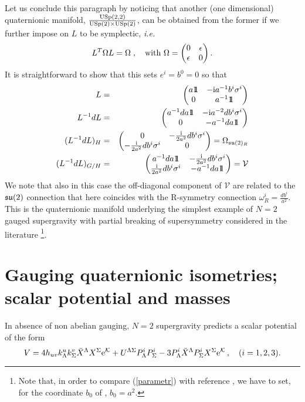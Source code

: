 \documentclass[a4paper,12pt]{article}
\begin{document}
Let us conclude this paragraph by noticing that another (one dimensional) quaternionic manifold, 
$\frac{\mathrm{USp}(2,2)}{\mathrm{USp}(2) \times \mathrm{USp}(2)}$, can be obtained from the former if we further impose on $L$ to be symplectic, {\em i.e.}
$$L^T \Omega L =\Omega \; ,\quad \mbox{with } \Omega = \begin{pmatrix}0&\epsilon \cr \epsilon &0 \cr \end{pmatrix}.$$ 
It is straightforward to show that this sets $e^i = b^0=0$ so that
 \begin{eqnarray}
L& =& \begin{pmatrix}a\id & -\ii a^{-1}b^i\sigma^i \cr 0 & a^{-1}\id 
\cr\end{pmatrix}
\nonumber\\
L^{-1} dL &=& \begin{pmatrix}a^{-1} da\id & -\ii a^{-2}db^i \sigma^i \cr 0 &-a^{-1} da\id \cr \end{pmatrix} \nonumber\\
(L^{-1} dL)_H &=& \begin{pmatrix}0 & -\frac\ii {2a^{2}}db^i \sigma^i \cr -\frac\ii {2a^{2}}db^i \sigma^i  &0\cr\end{pmatrix} =
\Omega_{\fsu(2)_R}\nonumber\\
(L^{-1} dL)_{G/H} &=& \begin{pmatrix}a^{-1} da \id  & -\frac\ii {2a^{2}}db^i \sigma^i \cr \frac\ii {2a^{2}}db^i \sigma^i  & -a^{-1} da \id
\cr\end{pmatrix} =
{\mathcal V} \label{parametr}
\end{eqnarray}
We note that also in this case the off-diagonal component of ${\mathcal V}$ 
are related to the $\mathfrak{su}(2)$ connection that here coincides with the R-symmetry connection $\omega^i_{R}= \frac{db^i}{a^2}$.
This is the quaternionic manifold underlying the simplest example of $N=2$ gauged supergravity with partial breaking of supersymmetry
considered in the literature \cite{cgp3,fgp}
\footnote{
Note that, in order to compare (\ref{parametr}) with reference \cite{fgp},  we have to set, for the coordinate $b_0$ of \cite{fgp}, 
$b_0=a^2$.}.

\section{Gauging quaternionic isometries; scalar potential and masses}

In absence of non abelian gauging, $N=2$ supergravity predicts a scalar potential of the form \cite{abcdffm}
\begin{equation}
V = 4 h_{uv} k^u_\Lambda k^v_\Sigma\bar X^\Lambda X^\Sigma {\rm e}^{\mathcal K} + U^{\Lambda\Sigma}
P^i_\Lambda P^i_\Sigma 
-3 P^i_\Lambda\bar X^\Lambda
 P^i_\Sigma X^\Sigma {\rm e}^{\mathcal K}\,, \quad (i=1,2,3). \label{potential}
\end{equation}
\end{document}
